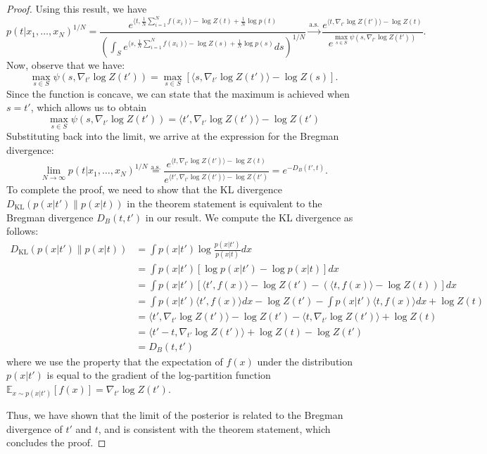 \documentclass{article}
\theoremstyle{plain}
\theoremstyle{definition}
\theoremstyle{remark}
\begin{document}
\begin{proof}
Using this result, we have
\begin{equation}
p(t|x_1, \ldots, x_N)^{1/N} = \frac{e^{\langle t, \frac{1}{N} \sum_{i=1}^N f(x_i) \rangle - \log Z(t) + \frac{1}{N} \log p(t)}}{\left(\int_S e^{\langle s, \frac{1}{N} \sum_{i=1}^N f(x_i) \rangle - \log Z(s) + \frac{1}{N} \log p(s)} ds \right)^{1/N}} \xrightarrow{\text{a.s.}} \frac{e^{\langle t, \nabla_{t'} \log Z(t') \rangle - \log Z(t)}}{e^{\max_{s \in S} \psi(s, \nabla_{t'} \log Z(t'))}}.
\end{equation}
Now, observe that we have:
\begin{equation}
\max_{s \in S} \psi(s, \nabla_{t'} \log Z(t')) = \max_{s \in S} \left[ \langle s, \nabla_{t'} \log Z(t') \rangle - \log Z(s) \right].
\end{equation}
Since the function is concave, we can state that the maximum is achieved when $s=t'$, which allows us to obtain
\begin{equation}
\max_{s \in S} \psi(s, \nabla_{t'} \log Z(t')) = \langle t', \nabla_{t'} \log Z(t') \rangle - \log Z(t')
\end{equation}
Substituting back into the limit, we arrive at the expression for the Bregman divergence:
\begin{equation}
\lim_{N \to \infty} p(t|x_1, \ldots, x_N)^{1/N} \overset{\text{a.s.}}{=} \frac{e^{\langle t, \nabla_{t'} \log Z(t') \rangle - \log Z(t)}}{e^{\langle t', \nabla_{t'} \log Z(t') \rangle - \log Z(t')}} = e^{-D_{B}(t',t)}.
\end{equation}
To complete the proof, we need to show that the KL divergence $D_\text{KL}(p(x|t') \| p(x|t))$ in the theorem statement is equivalent to the Bregman divergence $D_B(t, t')$ in our result. We compute the KL divergence as follows:
\begin{align*}
    D_\text{KL}(p(x|t') \| p(x|t)) &= \int p(x|t') \log\frac{p(x|t')}{p(x|t)} dx \\
    &= \int p(x|t') [\log p(x|t') - \log p(x|t)] dx \\
    &= \int p(x|t') [\langle t', f(x) \rangle - \log Z(t') - (\langle t, f(x) \rangle - \log Z(t))] dx \\
    &= \int p(x|t') \langle t', f(x) \rangle dx - \log Z(t') - \int p(x|t') \langle t, f(x) \rangle dx + \log Z(t) \\
    &= \langle t', \nabla_{t'} \log Z(t') \rangle - \log Z(t') - \langle t, \nabla_{t'} \log Z(t') \rangle + \log Z(t) \\
    &= \langle t' - t, \nabla_{t'} \log Z(t') \rangle + \log Z(t) - \log Z(t') \\
    &= D_B(t, t')
\end{align*}
where we use the property that the expectation of $f(x)$ under the distribution $p(x|t')$ is equal to the gradient of the log-partition function $ \mathbb{E}_{x\sim p(x|t')}[f(x)] = \nabla_{t'} \log Z(t')$.

Thus, we have shown that the limit of the posterior is related to the Bregman divergence of $t'$ and $t$, and is consistent with the theorem statement, which concludes the proof.

\end{proof}
\end{document}
